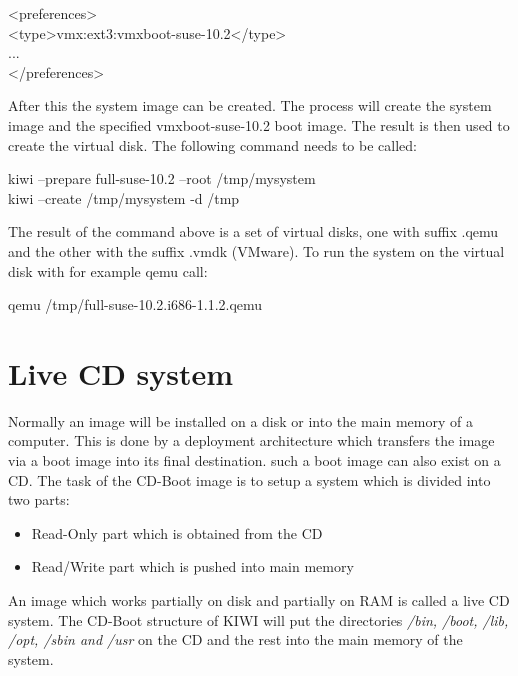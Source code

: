 \begin{Command}{14cm}
<preferences>\\
\hspace*{1cm}<type>vmx:ext3:vmxboot-suse-10.2</type>\\
\hspace*{1cm}...\\
</preferences>
\end{Command}

After this the system image can be created. The process will create the
system image and the specified vmxboot-suse-10.2 boot image. The result
is then used to create the virtual disk. The following command needs
to be called:

\begin{Command}{14cm}
	kiwi --prepare full-suse-10.2 --root /tmp/mysystem\\
	kiwi --create /tmp/mysystem -d /tmp
\end{Command}

The result of the command above is a set of virtual disks, one with
suffix .qemu and the other with the suffix .vmdk (VMware). To run the
system on the virtual disk with for example qemu call:

\begin{Command}{14cm}
	qemu /tmp/full-suse-10.2.i686-1.1.2.qemu
\end{Command}

\section{Live CD system}
Normally an image will be installed on a disk or into the
main memory of a computer. This is done by a deployment
architecture which transfers the image via a boot image
into its final destination. such a boot image can also
exist on a CD. The task of the CD-Boot image is to setup
a system which is divided into two parts:

\begin{itemize}
	\item Read-Only part which is obtained from the CD
	\item Read/Write part which is pushed into main memory
\end{itemize}

An image which works partially on disk and partially on RAM
is called a live CD system. The CD-Boot structure of KIWI will
put the directories \textit{/bin, /boot, /lib, /opt, /sbin and /usr}
on the CD and the rest into the main memory of the system.

